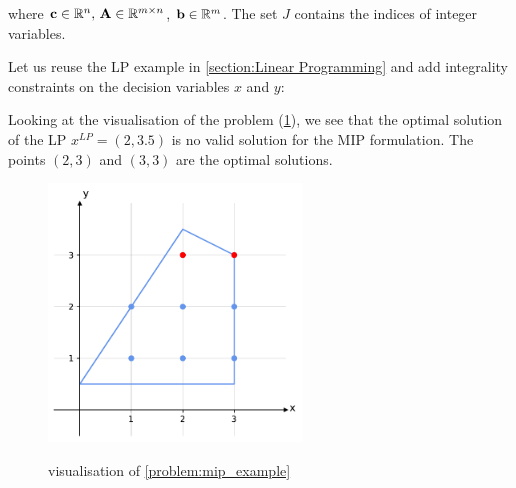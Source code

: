 \quad where $\bold c \in \mathbb{R}^n, \, \bold A \in \mathbb{R}^{m \times n}$, $\bold b \in \mathbb{R}^m$. The set $J$ contains the indices of integer variables. 

Let us reuse the LP example in \cref{section:Linear Programming} and add integrality constraints on the decision variables $x$ and $y$:

Looking at the visualisation of the problem (\cref{fig:mip}), we see that the optimal solution of the LP $x^{LP} = (2,3.5)$ is no valid solution for the MIP formulation. The points $(2,3)$ and $(3,3)$ are the optimal solutions.

\begin{figure}[h!]
    \caption{visualisation of \cref{problem:mip_example}}
    \centering
    \includegraphics[width=0.6\textwidth]{Images/mip.pdf}
    \label{fig:mip}
\end{figure}

